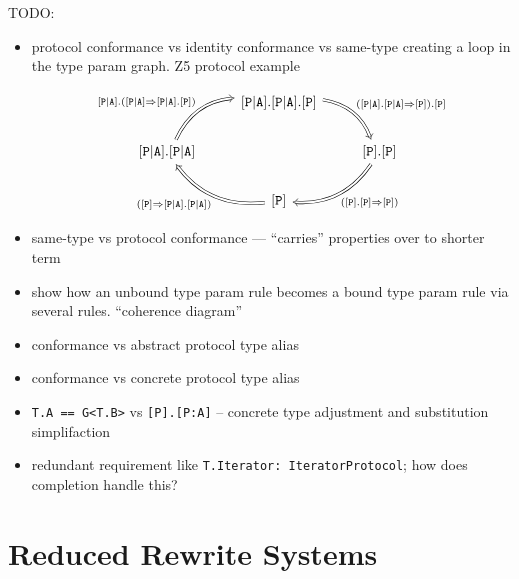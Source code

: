 \documentclass[../generics]{subfiles}
\begin{document}
TODO:
\begin{itemize}

\item protocol conformance vs identity conformance vs same-type creating a loop in the type param graph. Z5 protocol example

\[
\begin{tikzcd}
&\assocsym{P}{A}.\assocsym{P}{A}.\protosym{P}
\arrow[rd, Rightarrow, "(\assocsym{P}{A}.\assocsym{P}{A}\Rightarrow\protosym{P}).\protosym{P}", bend left]
\\
\assocsym{P}{A}.\assocsym{P}{A}
\arrow[ru, Rightarrow, "\assocsym{P}{A}.(\assocsym{P}{A}\Rightarrow\assocsym{P}{A}.\protosym{P})", bend left]
&&\protosym{P}.\protosym{P}\arrow[ld, Rightarrow, "(\protosym{P}.\protosym{P}\Rightarrow\protosym{P})", bend left]\\
&\protosym{P}\arrow[ul, Rightarrow, "(\protosym{P}\Rightarrow\assocsym{P}{A}.\assocsym{P}{A})", bend left]
\end{tikzcd}
\]

\item same-type vs protocol conformance --- ``carries'' properties over to shorter term
\item show how an unbound type param rule becomes a bound type param rule via several rules. ``coherence diagram''
\item conformance vs abstract protocol type alias
\item conformance vs concrete protocol type alias
\item \verb|T.A == G<T.B>| vs \verb|[P].[P:A]| -- concrete type adjustment and substitution simplifaction
\item redundant requirement like \texttt{T.Iterator: IteratorProtocol}; how does completion handle this?
\end{itemize}

\section{Reduced Rewrite Systems}\label{rule reduction}
\end{document}
